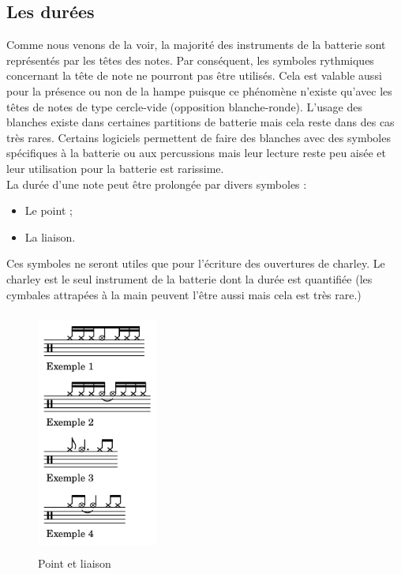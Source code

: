 \subsection*{Les durées}
\label{hho}
Comme nous venons de la voir, la majorité des instruments de la batterie sont représentés par les têtes des notes. 
Par conséquent, les symboles rythmiques concernant la tête de note ne pourront pas être utilisés. Cela est valable aussi pour la présence ou non de la hampe puisque ce phénomène n’existe qu’avec les têtes de notes de type cercle-vide (opposition blanche-ronde). L’usage des blanches existe dans certaines partitions de batterie \cite{system_drums} mais cela reste dans des cas très rares. Certains logiciels permettent de faire des blanches avec des symboles spécifiques à la batterie ou aux percussions mais leur lecture reste peu aisée et leur utilisation pour la batterie est rarissime.\\
La durée d’une note peut être prolongée par divers symboles :
\begin{itemize}
	\item Le point ; 
	\item La liaison.
\end{itemize}
Ces symboles ne seront utiles que pour l’écriture des ouvertures de charley. Le charley est le seul instrument de la batterie dont la durée est quantifiée (les cymbales attrapées à la main peuvent l’être aussi mais cela est très rare.)%

\begin{figure}[h]
	\centering
	\includegraphics[height=80mm, width=40mm]{z_images/3_methodes/0_notation_de_la_batterie/3_point_et_liaison.png}
	\caption{Point et liaison}
	\label{point_liaison}
\end{figure}

